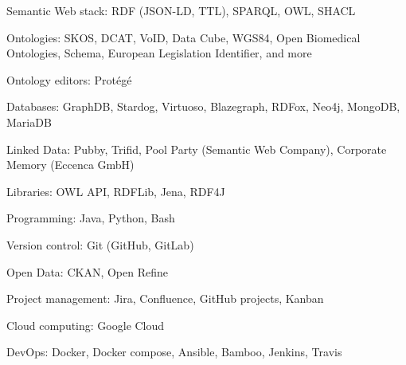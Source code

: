 \documentclass[11pt,fullpage]{article}
\renewenvironment{itemize}{
  \begin{list}{}{
    \setlength{\leftmargin}{1.5em}
  }
}{
  \end{list}
}
\begin{document}
\begin{itemize}
  \item Semantic Web stack: RDF (JSON-LD, TTL), SPARQL, OWL, SHACL
  \item Ontologies: SKOS, DCAT, VoID, Data Cube, WGS84, Open Biomedical Ontologies, Schema, European Legislation Identifier, and more
  \item Ontology editors: Prot\'eg\'e 
  \item Databases: GraphDB, Stardog, Virtuoso, Blazegraph, RDFox, Neo4j, 
  MongoDB,
  MariaDB
  \item Linked Data: Pubby, Trifid, Pool Party (Semantic Web Company), Corporate Memory (Eccenca GmbH)
  \item Libraries: OWL API, RDFLib, Jena, RDF4J
  \item Programming: Java, Python, Bash
  \item Version control: Git (GitHub, GitLab)
  \item Open Data: CKAN, Open Refine
  \item Project management: Jira, Confluence, GitHub projects, Kanban
  \item Cloud computing: Google Cloud %
  \item DevOps: Docker, Docker compose, Ansible, Bamboo, Jenkins, Travis
\end{itemize}
\end{document}
